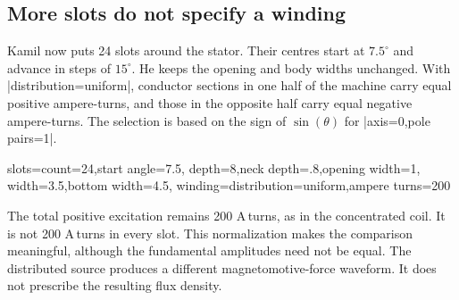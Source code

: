 
\begin{codeexample}[width=5.2cm]
\begin{tikzpicture}
\begin{axis}[width=9cm,height=4.6cm,no markers,grid=major,
    xmin=0,xmax=360,xtick={0,90,180,270,360},
    xlabel={Mechanical angle (degrees)},ylabel={$B_r$ (T)}]
  \femmplot[profile=kamil-single,component=Br,abscissa=angle]
\end{axis}
\end{tikzpicture}
\end{codeexample}


\begin{codeexample}[width=5.2cm]
\begin{tikzpicture}
\begin{axis}[width=9cm,height=4.2cm,ybar,bar width=4pt,
    ymin=0,xmin=.5,xmax=15.5,xtick={1,3,...,15},
    xlabel={Spatial harmonic order},ylabel={$B_n/B_1$}]
  \femmharmonicplot[profile=kamil-single,
    maximum order=15,normalize=true]
\end{axis}
\end{tikzpicture}
\end{codeexample}


\subsection{More slots do not specify a winding}

Kamil now puts 24 slots around the stator. Their centres start at
$7.5^\circ$ and advance in steps of $15^\circ$. He keeps the opening and body
widths unchanged. With |distribution=uniform|, conductor sections in one
half of the machine carry equal positive ampere-turns, and those in the
opposite half carry equal negative ampere-turns. The selection is based on
the sign of $\sin(\theta)$ for |axis=0,pole pairs=1|.

\begin{codeexample}
slots={count=24,start angle=7.5,
  depth=8,neck depth=.8,opening width=1,
  width=3.5,bottom width=4.5},
winding={distribution=uniform,ampere turns=200}
\end{codeexample}

The total positive excitation remains 200 A\,turns, as in the concentrated
coil. It is not 200 A\,turns in every slot. This normalization makes the
comparison meaningful, although the fundamental amplitudes need not be equal.
The distributed source produces a different magnetomotive-force waveform.
It does not prescribe the resulting flux density.

